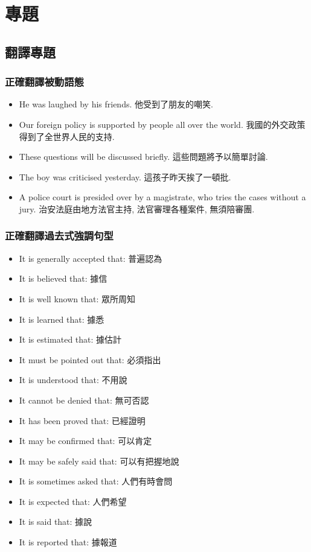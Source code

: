 \chapter{專題}

\section{翻譯專題}
\subsection{正確翻譯被動語態}
\begin{itemize}
  \itemsep0em
  \item He was laughed  by his friends. 他受到了朋友的嘲笑.
  \item Our foreign policy is supported by people all over the world. 我國的外交政策得到了全世界人民的支持.
  \item These questions will be discussed briefly. 這些問題將予以簡單討論.
  \item The boy was criticised yesterday. 這孩子昨天挨了一頓批.
  \item A police court is presided over by a magistrate, who tries the cases without a jury. 治安法庭由地方法官主持, 法官審理各種案件, 無須陪審團.
\end{itemize}

\subsection{正確翻譯過去式強調句型}
\begin{multicols}{2}
\begin{itemize}
  \itemsep0em
  \item It is generally accepted that: 普遍認為
  \item It is believed that: 據信
  \item It is well known that: 眾所周知
  \item It is learned that: 據悉
  \item It is estimated that: 據估計
  \item It must be pointed out that: 必須指出
  \item It is understood that: 不用說
  \item It cannot be denied that: 無可否認
  \item It has been proved that: 已經證明
  \item It may be confirmed that: 可以肯定
  \item It may be safely said that: 可以有把握地說
  \item It is sometimes asked that: 人們有時會問
  \item It is expected that: 人們希望
  \item It is said that: 據說
  \item It is reported that: 據報道
\end{itemize}
\end{multicols}

